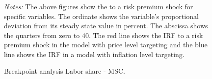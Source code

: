 \documentclass[11pt, a4paper, leqno]{article}
\begin{document}
\begin{figure}[ht!]
	\caption{Breakpoint analysis Labor share - MSC.}
	\label{fig:irf}
	\centering
    	\bigskip
	\begin{minipage}{\textwidth}%
		\footnotesize\setlength{\baselineskip}{11pt}%
		\bigskip \textit{Notes:} The above figures show the  to a risk premium shock for specific variables. The ordinate shows the variable's proportional deviation from its steady state value in percent. The abscissa shows the quarters from zero to 40. The red line shows the IRF to a risk premium shock in the model with price level targeting and the blue line shows the IRF in a model with inflation level targeting.
	\end{minipage}
\end{figure}
\end{document}
